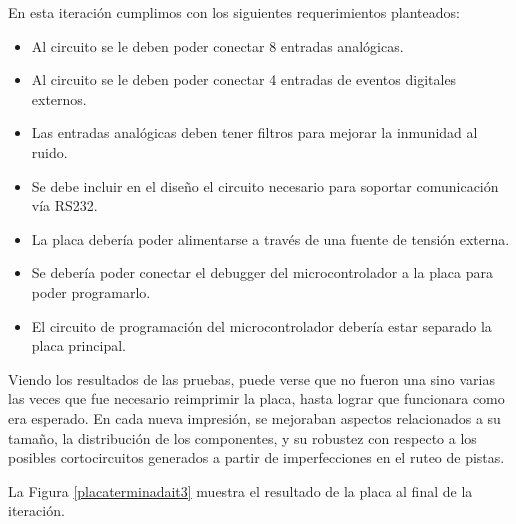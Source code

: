 En esta iteración cumplimos con los siguientes requerimientos planteados:
\begin{itemize}
  \item Al circuito se le deben poder conectar 8 entradas analógicas.
  \item Al circuito se le deben poder conectar 4 entradas de eventos digitales externos.
  \item Las entradas analógicas deben tener filtros para mejorar la inmunidad al ruido.
  \item Se debe incluir en el diseño el circuito necesario para soportar comunicación vía RS232.
  \item La placa debería poder alimentarse a través de una fuente de tensión externa.
  \item Se debería poder conectar el debugger del microcontrolador a la placa para poder programarlo.
  \item El circuito de programación del microcontrolador debería estar separado la placa principal.
\end{itemize}

Viendo los resultados de las pruebas, puede verse que no fueron una sino varias las veces que fue necesario reimprimir la placa, hasta lograr que funcionara como era esperado. En cada nueva impresión, se mejoraban aspectos relacionados a su tamaño, la distribución de los componentes, y su robustez con respecto a los posibles cortocircuitos generados a partir de imperfecciones en el ruteo de pistas.

La Figura \ref{placaterminadait3} muestra el resultado de la placa al final de la iteración.


